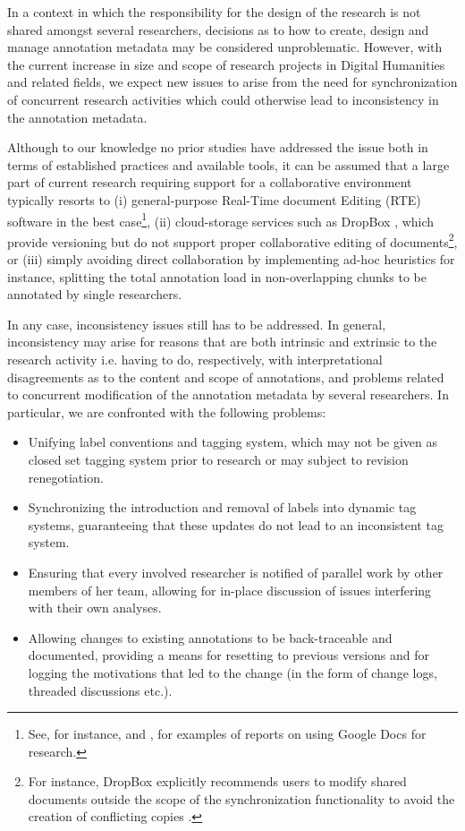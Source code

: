 \documentclass{sig-alternate}
\begin{document}
In a context in which the responsibility for the design of the research is not shared
amongst several researchers, decisions as to how to create, design and manage annotation
metadata may be considered unproblematic. However, with the current increase in size and scope of
research projects in Digital Humanities and related fields, we expect new issues to arise from
the need for synchronization of concurrent research activities which could otherwise lead to
inconsistency in the annotation metadata.

Although to our knowledge no prior studies have addressed the issue \textemdash both in terms of
established practices and available tools, %
it can be assumed that a large part of current research requiring support for a
collaborative environment typically resorts to (i) general-purpose Real-Time document Editing
(RTE) software in the best case\footnote{
  See, for instance, \cite{Rowlands2011} and \cite{Wood2011}, for examples of reports on
  using Google Docs for research.
}, (ii) cloud-storage services such as DropBox \cite{Dropboxa}, which provide versioning but do
not support proper collaborative editing of documents\footnote{
  For instance, DropBox explicitly recommends users to modify shared documents outside the scope
  of the synchronization functionality to avoid the creation of conflicting copies \cite{Dropbox}.
}, or (iii) simply avoiding direct collaboration by implementing ad-hoc heuristics \textemdash for
instance, splitting the total annotation load in non-overlapping chunks to be annotated by
single researchers.

In any case, inconsistency issues still has to be addressed. In general, inconsistency may arise
for reasons that are both intrinsic and extrinsic to the research activity \textemdash i.e. having
to do, respectively, with interpretational disagreements as to the content and scope of annotations,
and problems related to concurrent modification of the annotation metadata by several researchers.
In particular, we are confronted with the following problems:
\begin{itemize}
\item Unifying label conventions and tagging system, which may not be given as closed
  set tagging system prior to research or may subject to revision renegotiation.
\item Synchronizing the introduction and removal of labels into dynamic tag systems,
  guaranteeing that these updates do not lead to an inconsistent tag system.
\item Ensuring that every involved researcher is notified of parallel work by other members
  of her team, allowing for in-place discussion of issues interfering with their own analyses.
\item Allowing changes to existing annotations to be back-traceable and documented, providing
  a means for resetting to previous versions and for logging the motivations
  that led to the change (in the form of change logs, threaded discussions etc.).
\end{itemize}
\end{document}
